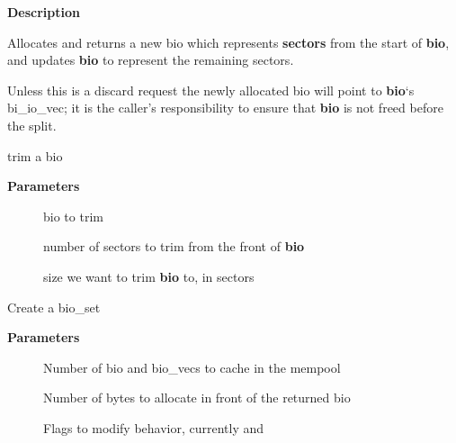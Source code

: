 \documentclass[a4paper,8pt,english]{sphinxmanual}
\begin{document}
\textbf{Description}

Allocates and returns a new bio which represents \textbf{sectors} from the start of
\textbf{bio}, and updates \textbf{bio} to represent the remaining sectors.

Unless this is a discard request the newly allocated bio will point
to \textbf{bio}`s bi\_io\_vec; it is the caller's responsibility to ensure that
\textbf{bio} is not freed before the split.

\begin{fulllineitems}
\label{filesystems/index:c.bio_trim}
trim a bio

\end{fulllineitems}


\textbf{Parameters}
\begin{description}
\item[{}] \leavevmode
bio to trim

\item[{}] \leavevmode
number of sectors to trim from the front of \textbf{bio}

\item[{}] \leavevmode
size we want to trim \textbf{bio} to, in sectors

\end{description}

\begin{fulllineitems}
\label{filesystems/index:c.bioset_create}
Create a bio\_set

\end{fulllineitems}


\textbf{Parameters}
\begin{description}
\item[{}] \leavevmode
Number of bio and bio\_vecs to cache in the mempool

\item[{}] \leavevmode
Number of bytes to allocate in front of the returned bio

\item[{}] \leavevmode
Flags to modify behavior, currently 
and 

\end{description}
\end{document}
